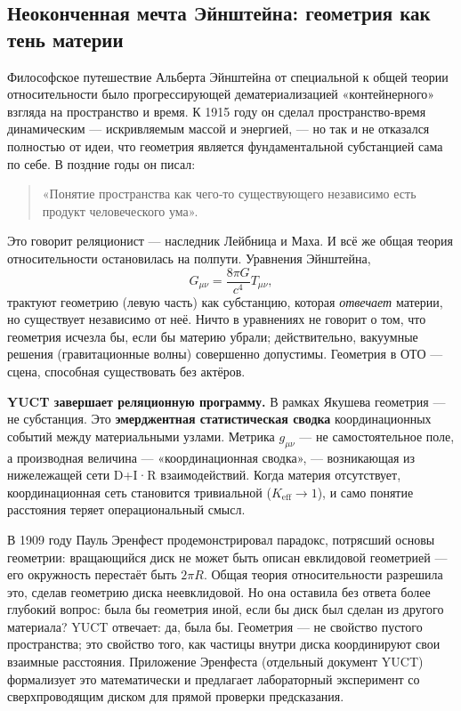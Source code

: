 \documentclass[12pt,a4paper]{article}
\begin{document}
	\subsection{Неоконченная мечта Эйнштейна: геометрия как тень материи}
	
	Философское путешествие Альберта Эйнштейна от специальной к общей теории относительности было прогрессирующей дематериализацией «контейнерного» взгляда на пространство и время. К 1915 году он сделал пространство‑время динамическим — искривляемым массой и энергией, — но так и не отказался полностью от идеи, что геометрия является фундаментальной субстанцией сама по себе. В поздние годы он писал:
	
	\begin{quote}
		«Понятие пространства как чего‑то существующего независимо есть продукт человеческого ума».
	\end{quote}
	
	Это говорит реляционист — наследник Лейбница и Маха. И всё же общая теория относительности остановилась на полпути. Уравнения Эйнштейна,
	\[
	G_{\mu\nu} = \frac{8\pi G}{c^4} T_{\mu\nu},
	\]
	трактуют геометрию (левую часть) как субстанцию, которая \emph{отвечает} материи, но существует независимо от неё. Ничто в уравнениях не говорит о том, что геометрия исчезла бы, если бы материю убрали; действительно, вакуумные решения (гравитационные волны) совершенно допустимы. Геометрия в ОТО — сцена, способная существовать без актёров.
	
	\textbf{YUCT завершает реляционную программу.} В рамках Якушева геометрия — не субстанция. Это \textbf{эмерджентная статистическая сводка} координационных событий между материальными узлами. Метрика \(g_{\mu\nu}\) — не самостоятельное поле, а производная величина — «координационная сводка», — возникающая из нижележащей сети D+I·R взаимодействий. Когда материя отсутствует, координационная сеть становится тривиальной (\(K_{\mathrm{eff}} \to 1\)), и само понятие расстояния теряет операциональный смысл.
	
	В 1909 году Пауль Эренфест продемонстрировал парадокс, потрясший основы геометрии: вращающийся диск не может быть описан евклидовой геометрией — его окружность перестаёт быть \(2\pi R\). Общая теория относительности разрешила это, сделав геометрию диска неевклидовой. Но она оставила без ответа более глубокий вопрос: была бы геометрия иной, если бы диск был сделан из другого материала? YUCT отвечает: да, была бы. Геометрия — не свойство пустого пространства; это свойство того, как частицы внутри диска координируют свои взаимные расстояния. Приложение Эренфеста (отдельный документ YUCT) формализует это математически и предлагает лабораторный эксперимент со сверхпроводящим диском для прямой проверки предсказания.
	
\end{document}
